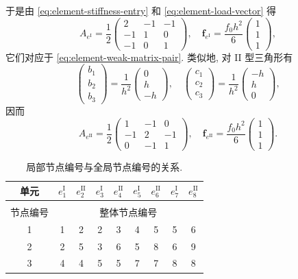 {于是由 \eqref{eq:element-stiffness-entry} 和 \eqref{eq:element-load-vector} 得}
\begin{equation}\label{eq:type-one-element-matrix}
A_{e^{\mathrm I}}=\frac12\begin{pmatrix}2&-1&-1\\-1&1&0\\-1&0&1\end{pmatrix},\quad
\boldsymbol{f}_{e^{\mathrm I}}=\frac{f_0h^2}{6}\begin{pmatrix}1\\1\\1\end{pmatrix},
\end{equation}
{它们对应于 \eqref{eq:element-weak-matrix-pair}. 类似地, 对 II 型三角形有}
\[\begin{pmatrix}b_1\\b_2\\b_3\end{pmatrix}=\frac1{h^2}\begin{pmatrix}0\\h\\-h\end{pmatrix},\quad
\begin{pmatrix}c_1\\c_2\\c_3\end{pmatrix}=\frac1{h^2}\begin{pmatrix}-h\\h\\0\end{pmatrix},\]
{因而}
\begin{equation}\label{eq:type-two-element-matrix}
A_{e^{\mathrm {II}}}=\frac12\begin{pmatrix}1&-1&0\\-1&2&-1\\0&-1&1\end{pmatrix},\quad
\boldsymbol{f}_{e^{\mathrm {II}}}=\frac{f_0h^2}{6}\begin{pmatrix}1\\1\\1\end{pmatrix}.
\end{equation}
\begin{table}[htbp]\centering
\caption{{局部节点编号与全局节点编号的关系.}}\label{tab:local-global-node-numbers}
\begin{tabular}{c|cccccccc}\hline
{单元}&$e_1^{\mathrm I}$&$e_2^{\mathrm {II}}$&$e_3^{\mathrm I}$&$e_4^{\mathrm {II}}$&$e_5^{\mathrm I}$&$e_6^{\mathrm {II}}$&$e_7^{\mathrm I}$&$e_8^{\mathrm {II}}$\\\hline
\shortstack{{三角形单元}\\{节点编号}}&\multicolumn{8}{c}{{整体节点编号}}\\\hline
1&1&2&2&3&4&5&5&6\\2&2&5&3&6&5&8&6&9\\3&4&4&5&5&7&7&8&8\\\hline
\end{tabular}\end{table}
